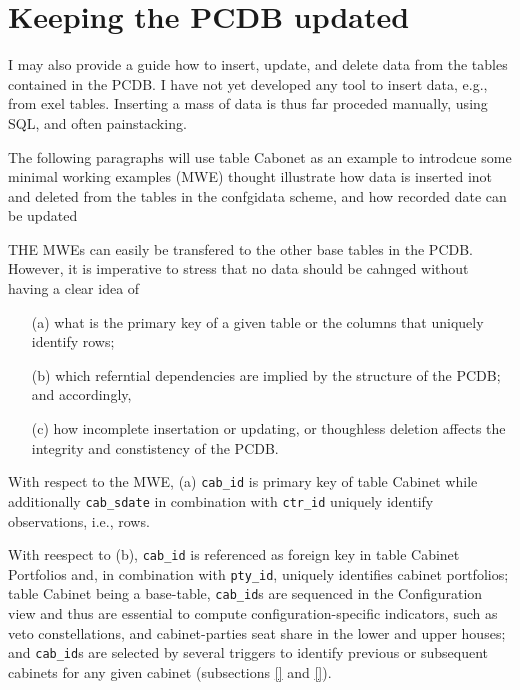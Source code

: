\section{Keeping the PCDB updated}\label{sec_keeping_the_PCDB_updated}
I may also provide a guide how to insert, update, and delete data from the tables contained in the PCDB.
I have not yet developed any tool to insert data, e.g., from exel tables. Inserting a mass of data is thus far proceded manually, using SQL, and often painstacking.


The following paragraphs will use table Cabonet as an example to introdcue some minimal working examples (MWE) thought illustrate how data is inserted inot and deleted from the tables in the confgi\-data scheme, and how recorded date can be updated

THE MWEs can easily be transfered to the other base tables in the PCDB. 
However, it is imperative to stress that no data should be cahnged without having a clear idea of 
\begin{itemize}
\item[(a)]what is the primary key of a given table or the columns that uniquely identify rows;
\item[(b)]which referntial dependencies are implied by the structure of the PCDB; and accordingly,
\item[(c)]how incomplete insertation or updating, or thoughless deletion affects the integrity and constistency of the PCDB.
\end{itemize}

With respect to the MWE, 
(a) \texttt{\footnotesize cab\_id} is primary key of table Cabinet while additionally \texttt{\footnotesize cab\_sdate} in combination with \texttt{\footnotesize ctr\_id} uniquely identify observations, i.e., rows. 

With reespect to (b), \texttt{\footnotesize cab\_id} is referenced as foreign key in table Cabinet Portfolios and, in combination with \texttt{\footnotesize pty\_id}, uniquely identifies cabinet portfolios; table Cabinet being a base-table, \texttt{\footnotesize  cab\_id}s are sequenced in the Configuration view and thus are essential to compute configuration-specific indicators, such as veto constellations, and cabinet-parties seat share in the lower and upper houses; and \texttt{\footnotesize cab\_id}s are selected by several triggers to identify previous or subsequent cabinets for any given cabinet (subsections \ref{} and \ref{}).

